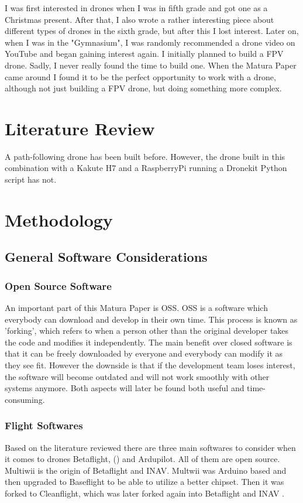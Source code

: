 \documentclass[svgnames]{article}
\begin{document}
	I was first interested in drones when I was in fifth grade and got one as a Christmas present. After that, I also wrote a rather interesting piece about different types of drones in the sixth grade, but after this I lost interest. Later on, when I was in the "Gymnasium", I was randomly recommended a drone video on YouTube and began gaining interest again. I initially planned to build a \gls{FPV} drone. Sadly, I never really found the time to build one. When the Matura Paper came around I found it to be the perfect opportunity to work with a drone, although not just building a \gls{FPV} drone, but doing something more complex.


	\section{Literature Review}
	A path-following drone has been built before. However, the drone built in this combination with a Kakute H7 and a RaspberryPi running a Dronekit Python script has not.
	
	
	\section{Methodology}
	\subsection{General Software Considerations}

	\subsubsection{Open Source Software}
	An important part of this Matura Paper is \gls{OSS}. \gls{OSS} is a software which everybody can download and develop in their own time. This process is known as 'forking', which refers to when a person other than the original developer takes the code and modifies it independently. The main benefit over closed software is that it can be freely downloaded by everyone and everybody can modify it as they see fit. However the downside is that if the development team loses interest, the software will become outdated and will not work smoothly with other systems anymore. Both aspects will later be found both useful and time-consuming. 
	
	
	\subsubsection{Flight Softwares}
	Based on the literature reviewed there are three main softwares to consider when it comes to drones Betaflight, \myinav () and Ardupilot. All of them are open source. Multiwii is the origin of Betaflight and \gls{INAV}. Multwii was Arduino based and then upgraded to Baseflight to be able to utilize a better chipset. Then it was forked to Cleanflight, which was later forked again into Betaflight and \gls{INAV} \cite{history}. 
	
\end{document}
